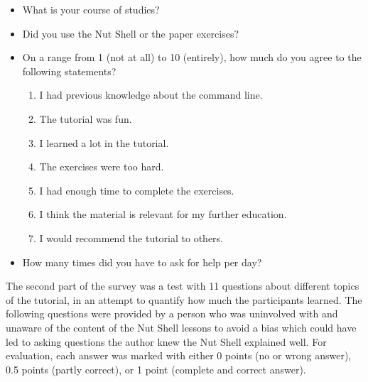 \documentclass[paper=a4,twoside,abstract=on,cleardoublepage=empty,numbers=noenddot,toc=bib,toc=listof,12pt,appendixprefix=true]{scrreprt}
\begin{document}
\begin{itemize}
    \item What is your course of studies?
    \item Did you use the Nut Shell or the paper exercises?
    \item On a range from 1 (not at all) to 10 (entirely), how much do you agree to the following statements?
        \begin{enumerate}
            \item I had previous knowledge about the command line.
            \item The tutorial was fun.
            \item I learned a lot in the tutorial.
            \item The exercises were too hard.
            \item I had enough time to complete the exercises.
            \item I think the material is relevant for my further education.
            \item I would recommend the tutorial to others.
        \end{enumerate}
    \item How many times did you have to ask for help per day?
\end{itemize}

The second part of the survey was a test with 11 questions about different topics of the tutorial, in an attempt to quantify how much the participants learned. The following questions were provided by a person who was uninvolved with and unaware of the content of the Nut Shell lessons to avoid a bias which could have led to asking questions the author knew the Nut Shell explained well. For evaluation, each answer was marked with either 0 points (no or wrong answer), 0.5 points (partly correct), or 1 point (complete and correct answer).
\end{document}
